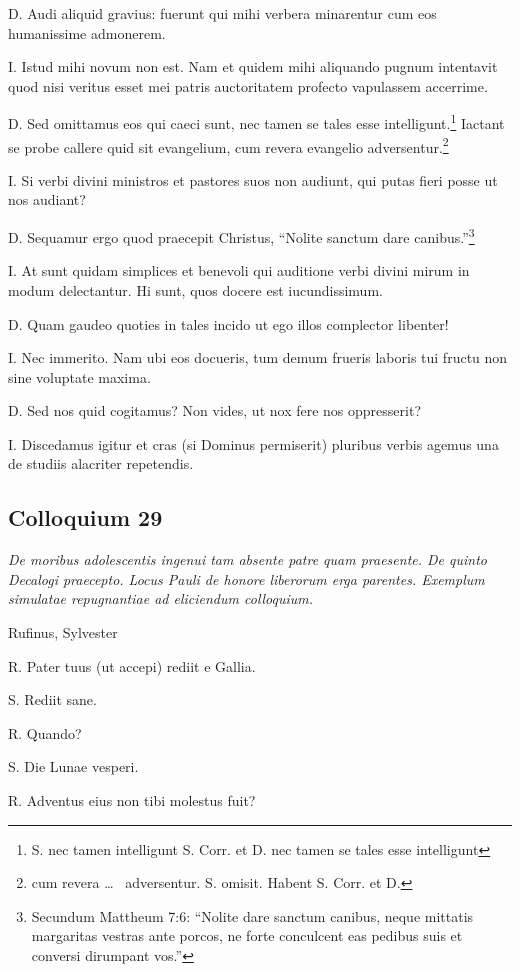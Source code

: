 \documentclass{article}
\begin{document}
D. Audi aliquid gravius: fuerunt qui mihi verbera minarentur cum eos humanissime admonerem.

I. Istud mihi novum non est. Nam et quidem mihi aliquando pugnum intentavit quod nisi veritus esset mei patris auctoritatem profecto vapulassem accerrime.

D. Sed omittamus eos qui caeci sunt, nec tamen se tales esse intelligunt.\footnote{S. nec tamen intelligunt S. Corr. et D. nec tamen se tales esse intelligunt} Iactant se probe callere quid sit evangelium, cum revera evangelio adversentur.\footnote{cum revera \ldots~ adversentur. S. omisit.  Habent S. Corr. et  D.}

I. Si verbi divini ministros et pastores suos non audiunt, qui putas fieri posse ut nos audiant?

D. Sequamur ergo quod praecepit Christus, ``Nolite sanctum dare canibus.''\footnote{Secundum Mattheum 7:6: ``Nolite dare sanctum canibus, neque mittatis margaritas vestras ante porcos, ne forte conculcent eas pedibus suis et conversi dirumpant vos.''}

I. At sunt quidam simplices et benevoli qui auditione verbi divini mirum in modum delectantur. Hi sunt, quos docere est iucundissimum.

D. Quam gaudeo quoties in tales incido ut ego illos complector libenter!

I. Nec immerito. Nam ubi eos docueris, tum demum frueris laboris tui fructu non sine voluptate maxima.

D. Sed nos quid cogitamus? Non vides, ut nox fere nos oppresserit?

I. Discedamus igitur et cras (si Dominus permiserit) pluribus verbis agemus una de studiis alacriter repetendis.

\subsection{Colloquium 29}
\emph{De moribus adolescentis ingenui tam absente patre quam praesente. De quinto Decalogi praecepto. Locus Pauli de honore liberorum erga parentes. Exemplum simulatae repugnantiae ad eliciendum colloquium.}

Rufinus, Sylvester

R. Pater tuus (ut accepi) rediit e Gallia.

S. Rediit sane.

R. Quando?

S. Die Lunae vesperi.

R. Adventus eius non tibi molestus fuit?
\end{document}
